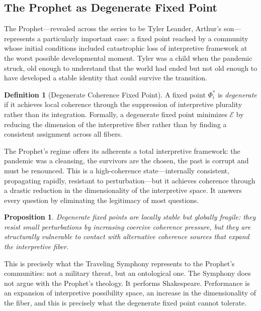 \documentclass[12pt, oneside]{article}
\theoremstyle{plain}
\newtheorem{proposition}[theorem]{Proposition}
\theoremstyle{definition}
\newtheorem{definition}[theorem]{Definition}
\theoremstyle{remark}
\newcommand{\Field}{\Phi}
\begin{document}
\subsection{The Prophet as Degenerate Fixed Point}

The Prophet---revealed across the series to be Tyler Leander,
Arthur's son---represents a particularly important case: a fixed
point reached by a community whose initial conditions included
catastrophic loss of interpretive framework at the worst possible
developmental moment. Tyler was a child when the pandemic struck,
old enough to understand that the world had ended but not old enough
to have developed a stable identity that could survive the
transition.

\begin{definition}[Degenerate Coherence Fixed Point]
A fixed point $\Field_i^*$ is \emph{degenerate} if it achieves local
coherence through the suppression of interpretive plurality rather
than its integration. Formally, a degenerate fixed point minimizes
$\mathcal{E}$ by reducing the dimension of the interpretive fiber
rather than by finding a consistent assignment across all fibers.
\end{definition}

The Prophet's regime offers its adherents a total interpretive
framework: the pandemic was a cleansing, the survivors are the
chosen, the past is corrupt and must be renounced. This is a
high-coherence state---internally consistent, propagating rapidly,
resistant to perturbation---but it achieves coherence through a
drastic reduction in the dimensionality of the interpretive space.
It answers every question by eliminating the legitimacy of most
questions.

\begin{proposition}
Degenerate fixed points are locally stable but globally fragile:
they resist small perturbations by increasing coercive coherence
pressure, but they are structurally vulnerable to contact with
alternative coherence sources that expand the interpretive fiber.
\end{proposition}

This is precisely what the Traveling Symphony represents to the
Prophet's communities: not a military threat, but an ontological one.
The Symphony does not argue with the Prophet's theology. It
performs Shakespeare. Performance is an expansion of interpretive
possibility space, an increase in the dimensionality of the fiber,
and this is precisely what the degenerate fixed point cannot
tolerate.
\end{document}
